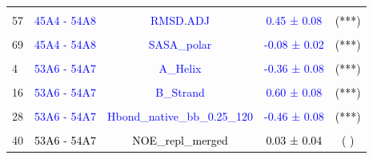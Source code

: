 \documentclass{article}\usepackage[table]{xcolor}
\renewcommand{\$}{$} %
\begin{document}
\begin{center}
\begin{longtable}[t]{lcccc}
\cellcolor{gray!6}{51} & \cellcolor{gray!6}{\textcolor{blue}{45A4 - 54A8}} & \cellcolor{gray!6}{\textcolor{blue}{Rgyr}} & \cellcolor{gray!6}{\textcolor{blue}{-0.02 ± 0.00}} & \cellcolor{gray!6}{\textcolor{black}{(***)}}\\
57 & \textcolor{blue}{45A4 - 54A8} & \textcolor{blue}{RMSD.ADJ} & \textcolor{blue}{0.45 ± 0.08} & \textcolor{black}{(***)}\\
\cellcolor{gray!6}{63} & \cellcolor{gray!6}{\textcolor{blue}{45A4 - 54A8}} & \cellcolor{gray!6}{\textcolor{blue}{SASA\_nonpolar}} & \cellcolor{gray!6}{\textcolor{blue}{-0.04 ± 0.01}} & \cellcolor{gray!6}{\textcolor{black}{(**)}}\\
69 & \textcolor{blue}{45A4 - 54A8} & \textcolor{blue}{SASA\_polar} & \textcolor{blue}{-0.08 ± 0.02} & \textcolor{black}{(***)}\\
\cellcolor{gray!6}{75} & \cellcolor{gray!6}{\textcolor{black}{45A4 - 54A8}} & \cellcolor{gray!6}{\textcolor{black}{ThreeTen\_Helix}} & \cellcolor{gray!6}{\textcolor{black}{-0.10 ± 0.08}} & \cellcolor{gray!6}{\textcolor{black}{( )}}\\
4 & \textcolor{blue}{53A6 - 54A7} & \textcolor{blue}{A\_Helix} & \textcolor{blue}{-0.36 ± 0.08} & \textcolor{black}{(***)}\\
\cellcolor{gray!6}{10} & \cellcolor{gray!6}{\textcolor{black}{53A6 - 54A7}} & \cellcolor{gray!6}{\textcolor{black}{B\_Bridge}} & \cellcolor{gray!6}{\textcolor{black}{0.07 ± 0.06}} & \cellcolor{gray!6}{\textcolor{black}{( )}}\\
16 & \textcolor{blue}{53A6 - 54A7} & \textcolor{blue}{B\_Strand} & \textcolor{blue}{0.60 ± 0.08} & \textcolor{black}{(***)}\\
\cellcolor{gray!6}{22} & \cellcolor{gray!6}{\textcolor{blue}{53A6 - 54A7}} & \cellcolor{gray!6}{\textcolor{blue}{Hbond\_bb\_0.25\_120}} & \cellcolor{gray!6}{\textcolor{blue}{-0.54 ± 0.06}} & \cellcolor{gray!6}{\textcolor{black}{(***)}}\\
28 & \textcolor{blue}{53A6 - 54A7} & \textcolor{blue}{Hbond\_native\_bb\_0.25\_120} & \textcolor{blue}{-0.46 ± 0.08} & \textcolor{black}{(***)}\\
\cellcolor{gray!6}{34} & \cellcolor{gray!6}{\textcolor{black}{53A6 - 54A7}} & \cellcolor{gray!6}{\textcolor{black}{Jvalue}} & \cellcolor{gray!6}{\textcolor{black}{0.09 ± 0.09}} & \cellcolor{gray!6}{\textcolor{black}{( )}}\\
40 & \textcolor{black}{53A6 - 54A7} & \textcolor{black}{NOE\_repl\_merged} & \textcolor{black}{0.03 ± 0.04} & \textcolor{black}{( )}\\

\end{longtable}
\end{center}
\end{document}
